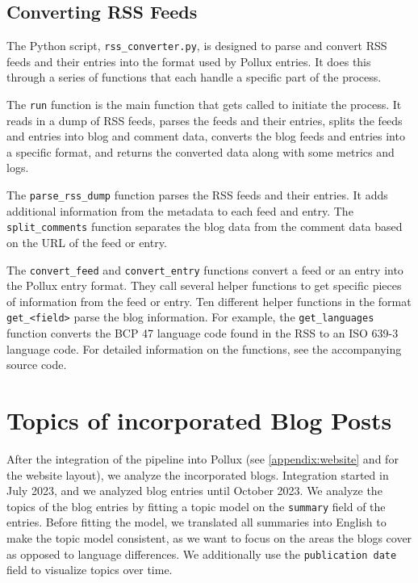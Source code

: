 \documentclass{article}
\begin{document}
\subsection{Converting RSS Feeds}

The Python script, \texttt{rss\_converter.py}, is designed to parse and convert RSS feeds and their entries into the format used by Pollux entries. It does this through a series of functions that each handle a specific part of the process.

The \texttt{run} function is the main function that gets called to initiate the process. It reads in a dump of RSS feeds, parses the feeds and their entries, splits the feeds and entries into blog and comment data, converts the blog feeds and entries into a specific format, and returns the converted data along with some metrics and logs.

The \texttt{parse\_rss\_dump} function parses the RSS feeds and their entries. It adds additional information from the metadata to each feed and entry.
The \texttt{split\_comments} function separates the blog data from the comment data based on the URL of the feed or entry.

The \texttt{convert\_feed} and \texttt{convert\_entry} functions convert a feed or an entry into the Pollux entry format. They call several helper functions to get specific pieces of information from the feed or entry.
Ten different helper functions in the format \texttt{get\_<field>} parse the blog information. For example, the \texttt{get\_languages} function converts the BCP 47 language code found in the RSS to an ISO 639-3 language code. For detailed information on the functions, see the accompanying source code.

\section{Topics of incorporated Blog Posts}\label{sec:Visualization}
After the integration of the pipeline into Pollux (see \autoref{appendix:website} and \citet{czolkoss-hettwerPolitikwissenschaftlicheBlogsSichtbar2023} for the website layout), we analyze the incorporated blogs. Integration started in July 2023, and we analyzed blog entries until October 2023. We analyze the topics of the blog entries by fitting a topic model on the \texttt{summary} field of the entries. Before fitting the model, we translated all summaries into English to make the topic model consistent, as we want to focus on the areas the blogs cover as opposed to language differences. We additionally use the \texttt{publication date} field to visualize topics over time.
\end{document}
